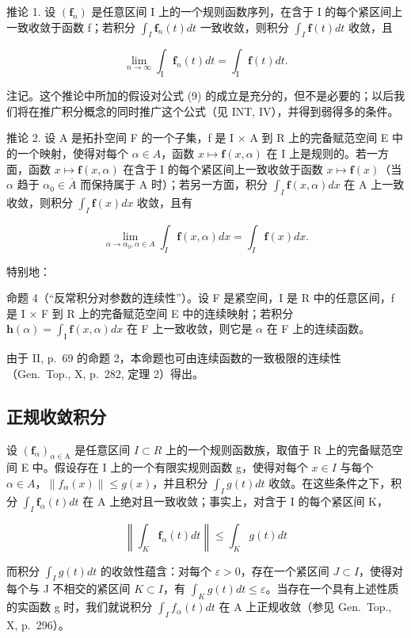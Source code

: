 推论 1. 设 \((\mathbf{f}_{n})\) 是任意区间 I 上的一个规则函数序列，在含于 I 的每个紧区间上一致收敛于函数 f；若积分 \(\int_{I} \mathbf{f}_{n}(t) dt\) 一致收敛，则积分 \(\int_{I} \mathbf{f}(t) dt\) 收敛，且

\[
\lim _ {n \to \infty} \int_ {\mathrm{I}} \mathbf {f} _ {n} (t) d t = \int_ {\mathrm{I}} \mathbf {f} (t) d t.\tag{9}
\]

注记。这个推论中所加的假设对公式 (9) 的成立是充分的，但不是必要的；以后我们将在推广积分概念的同时推广这个公式（见 INT, IV），并得到弱得多的条件。

推论 2. 设 A 是拓扑空间 F 的一个子集，f 是 I × A 到 R 上的完备赋范空间 E 中的一个映射，使得对每个 \(\alpha \in A\)，函数 \(x \mapsto \mathbf{f}(x, \alpha)\) 在 I 上是规则的。若一方面，函数 \(x \mapsto \mathbf{f}(x, \alpha)\) 在含于 I 的每个紧区间上一致收敛于函数 \(x \mapsto \mathbf{f}(x)\)（当 \(\alpha\) 趋于 \(\alpha_{0} \in \overline{A}\) 而保持属于 A 时）；若另一方面，积分 \(\int_{I} \mathbf{f}(x, \alpha) dx\) 在 A 上一致收敛，则积分 \(\int_{I} \mathbf{f}(x) dx\) 收敛，且有

\[
\lim _ {\alpha \rightarrow \alpha_ {0}, \alpha \in A} \int_ {I} \mathbf {f} (x, \alpha) d x = \int_ {I} \mathbf {f} (x) d x.\tag{10}
\]

特别地：

命题 4（“反常积分对参数的连续性”）。设 F 是紧空间，I 是 R 中的任意区间，f 是 I × F 到 R 上的完备赋范空间 E 中的连续映射；若积分 \(\mathbf{h}(\alpha) = \int_{\mathrm{I}} \mathbf{f}(x, \alpha) dx\) 在 F 上一致收敛，则它是 \(\alpha\) 在 F 上的连续函数。

由于 II, p.~69 的命题 2，本命题也可由连续函数的一致极限的连续性（Gen.~Top., X, p.~282, 定理 2）得出。

\subsection{正规收敛积分}

设 \((\mathbf{f}_{\alpha})_{\alpha\in\mathrm{A}}\) 是任意区间 \(I\subset R\) 上的一个规则函数族，取值于 R 上的完备赋范空间 E 中。假设存在 I 上的一个有限实规则函数 g，使得对每个 \(x\in I\) 与每个 \(\alpha\in A\)，\(\|f_{\alpha}(x)\|\leqslant g(x)\)，并且积分 \(\int_{I}g(t)dt\) 收敛。在这些条件之下，积分 \(\int_{I}\mathbf{f}_{\alpha}(t)dt\) 在 A 上绝对且一致收敛；事实上，对含于 I 的每个紧区间 K，

\[
\left\| \int_ {K} \mathbf {f} _ {\alpha} (t) d t \right\| \leqslant \int_ {K} g (t) d t
\]

而积分 \(\int_{I} g(t) dt\) 的收敛性蕴含：对每个 \(\varepsilon > 0\)，存在一个紧区间 \(J \subset I\)，使得对每个与 J 不相交的紧区间 \(K \subset I\)，有 \(\int_{K} g(t) dt \leqslant \varepsilon\)。当存在一个具有上述性质的实函数 g 时，我们就说积分 \(\int_{I} f_{\alpha}(t) dt\) 在 A 上正规收敛（参见 Gen.~Top., X, p.~296）。

